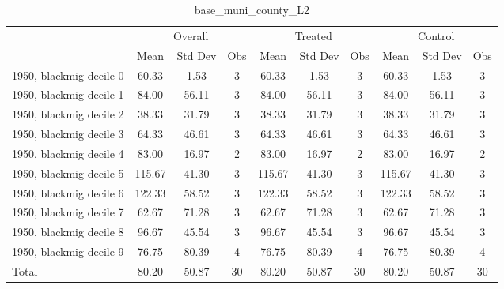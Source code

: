 \begin{table}[htbp]\centering
\def\sym#1{\ifmmode^{#1}\else\(^{#1}\)\fi}
\caption{base\_muni\_county\_L2 \label{tab1}}
\begin{tabular}{l*{3}{ccc}}
\toprule
                    &\multicolumn{3}{c}{Overall}           &\multicolumn{3}{c}{Treated}           &\multicolumn{3}{c}{Control}           \\
                    &        Mean&     Std Dev&         Obs&        Mean&     Std Dev&         Obs&        Mean&     Std Dev&         Obs\\
\midrule
1950, blackmig decile 0&       60.33&        1.53&           3&       60.33&        1.53&           3&       60.33&        1.53&           3\\
1950, blackmig decile 1&       84.00&       56.11&           3&       84.00&       56.11&           3&       84.00&       56.11&           3\\
1950, blackmig decile 2&       38.33&       31.79&           3&       38.33&       31.79&           3&       38.33&       31.79&           3\\
1950, blackmig decile 3&       64.33&       46.61&           3&       64.33&       46.61&           3&       64.33&       46.61&           3\\
1950, blackmig decile 4&       83.00&       16.97&           2&       83.00&       16.97&           2&       83.00&       16.97&           2\\
1950, blackmig decile 5&      115.67&       41.30&           3&      115.67&       41.30&           3&      115.67&       41.30&           3\\
1950, blackmig decile 6&      122.33&       58.52&           3&      122.33&       58.52&           3&      122.33&       58.52&           3\\
1950, blackmig decile 7&       62.67&       71.28&           3&       62.67&       71.28&           3&       62.67&       71.28&           3\\
1950, blackmig decile 8&       96.67&       45.54&           3&       96.67&       45.54&           3&       96.67&       45.54&           3\\
1950, blackmig decile 9&       76.75&       80.39&           4&       76.75&       80.39&           4&       76.75&       80.39&           4\\
Total               &       80.20&       50.87&          30&       80.20&       50.87&          30&       80.20&       50.87&          30\\
\bottomrule
\end{tabular}
\end{table}
